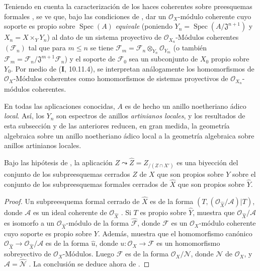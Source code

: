 \begin{scholium}[5.1.7]
\label{III.5.1.7}
\label{III.5.1.7-fr}
Teniendo en cuenta la caracterización de los haces coherentes sobre
preesquemas formales , se ve que, bajo las
condiciones de , dar un
$\mathcal O_X$-módulo coherente cuyo soporte es propio sobre $\operatorname{Spec}(A)$ \emph{equivale} (poniendo
$Y_n=\operatorname{Spec}(A/\mathfrak J^{n+1})$ y $X_n=X\times_Y Y_n$) al dato
de un sistema proyectivo de $\mathcal O_{X_n}$-Módulos coherentes $(\mathcal F_n)$ tal
que para $m\leq n$ se tiene
$\mathcal F_m=\mathcal F_n\otimes_{Y_n}\mathcal O_{Y_m}$
(o también $\mathcal F_m=\mathcal F_n/\mathfrak J^{m+1}\mathcal F_n$)
y el soporte de $\mathcal F_0$ sea un subconjunto de $X_0$
propio sobre $Y_0$. Por medio de (\textbf{I}, 10.11.4), se interpretan análogamente los homomorfismos de $\mathcal O_X$-Módulos coherentes como homomorfismos de sistemas proyectivos de $\mathcal O_{X_n}$-módulos coherentes.


En todas las aplicaciones conocidas, $A$ es de hecho un anillo
noetheriano ádico \emph{local}. Así, los $Y_n$ son espectros de anillos
\emph{artinianos locales}, y los resultados de esta subsección y de las
anteriores reducen, en gran medida, la geometría algebraica sobre un
anillo noetheriano ádico local a la geometría algebraica sobre anillos
artinianos locales.
\end{scholium}

\begin{corollary}[5.1.8]
\label{III.5.1.8}
\label{III.5.1.8-fr}
Bajo las hipótesis de , la aplicación
$Z\leadsto\widehat Z=Z_{/(Z\cap X')}$
es una biyección del conjunto de los subpreesquemas cerrados $Z$ de $X$
que son propios sobre $Y$ sobre el conjunto de los subpreesquemas
formales cerrados de $\widehat X$ que son propios sobre
$\widehat Y$.
\end{corollary}

\begin{proof}
Un subpreesquema formal cerrado de $\widehat X$ es de la forma
$(T,(\mathcal O_{\widehat X}/\mathcal A)|T)$,
donde $\mathcal A$ es un ideal coherente de
$\mathcal O_{\widehat X}$ . Si $T$ es propio sobre
$\widehat Y$,  muestra que
$\mathcal O_{\widehat X}/\mathcal A$ es isomorfo a un
$\mathcal O_{\widehat X}$-módulo de la forma
$\widehat{\mathcal F}$, donde $\mathcal F$ es un
$\mathcal O_X$-módulo coherente cuyo soporte es propio sobre $Y$. Además,
 muestra que el homomorfismo canónico
$\mathcal O_{\widehat X}\to\mathcal O_{\widehat X}/\mathcal A$
es de la forma $\widehat u$, donde
$u:\mathcal O_X\to\mathcal F$ es un homomorfismo sobreyectivo de
$\mathcal O_X$-Módulos. Luego $\mathcal F$ es de la forma
$\mathcal O_X/\mathcal N$, donde $\mathcal N$ de
$\mathcal O_X$, y
$\mathcal A=\widehat{\mathcal N}$ . La conclusión se
deduce ahora de .
\end{proof}


